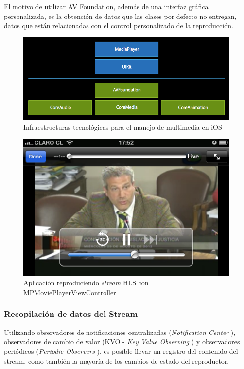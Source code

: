 El motivo de utilizar AV Foundation, además de una interfaz gráfica personalizada, es la obtención de datos que las clases por defecto no entregan, datos que están relacionadas con el control personalizado de la reproducción.


\begin{figure}[H]
	\centering
	\includegraphics[scale=0.5]{imgs/ios-tech-frameworks.png}
	\caption{Infraestructuras tecnológicas para el manejo de multimedia en iOS}
	\label{IMG-ios-tech-frameworks}	
\end{figure}

\begin{figure}[H]
	\centering
	\includegraphics[scale=0.3]{imgs/mpmpvc-example.png}
	\caption{Aplicación reproduciendo \textit{stream} HLS con MPMoviePlayerViewController}
	\label{IMG-mpmpvc-example}	
\end{figure}

		\subsubsection{Recopilación de datos del Stream}
Utilizando observadores de notificaciones centralizadas (\textit{Notification Center} \cite{bib:ios-nsnotificationcenter}), observadores de cambio de valor (KVO - \textit{Key Value Observing} \cite{bib:kvo-guide}) y observadores periódicos (\textit{Periodic Observers} \cite{bib:avplayer-periodic}), es posible llevar un registro del contenido del stream, como también la mayoría de los cambios de estado del reproductor.\\

